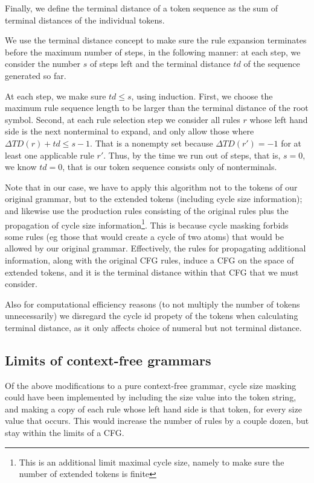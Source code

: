 \documentclass{article}
\begin{document}
Finally, we define the terminal distance of a token sequence as the sum of terminal distances of the individual tokens. 

We use the terminal distance concept to make sure the rule expansion terminates before the maximum number of steps, in the following manner: at each step, we consider the number $s$ of steps left and the terminal distance $td$ of the sequence generated so far. 

At each step, we make sure $td\le s$, using induction. First, we choose the maximum rule sequence length to be larger than the terminal distance of the root symbol. Second, at each rule selection step we consider all rules $r$ whose left hand side is the next nonterminal to expand, and only allow those where $\Delta TD(r) + td \le s-1$. That is a nonempty set because $\Delta TD(r')=-1$ for at least one applicable rule $r'$. Thus, by the time we run out of steps, that is, $s=0$, we know $td=0$, that is our token sequence consists only of nonterminals. 

Note that in our case, we have to apply this algorithm not to the tokens of our original grammar, but to the extended tokens (including cycle size information); and likewise use the production rules consisting of the original rules plus the propagation of cycle size information\footnote{This is an additional limit maximal cycle size, namely to make sure the number of extended tokens is finite}. This is because cycle masking forbids some rules (eg those that would create a cycle of two atoms) that would be allowed by our original grammar. Effectively, the rules for propagating additional information, along with the original CFG rules, induce a CFG on the space of extended tokens, and it is the terminal distance within that CFG that we must consider.
 
Also for computational efficiency reasons (to not multiply the number of tokens unnecessarily) we disregard the cycle id propety of the tokens when calculating terminal distance, as it only affects choice of numeral but not terminal distance. 

\subsection{Limits of context-free grammars}
Of the above modifications to a pure context-free grammar, cycle size masking could have been implemented by including the size value into the token string, and making a copy of each rule whose left hand side is that token, for every size value that occurs. This would increase the number of rules by a couple dozen, but stay within the limits of a CFG.
\end{document}
